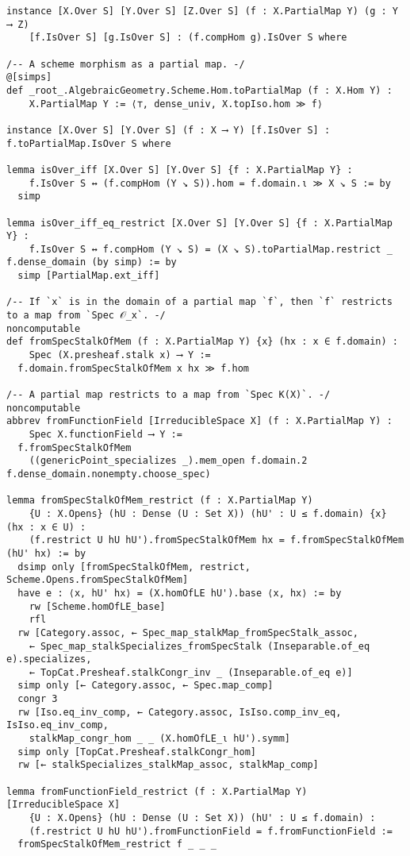 \documentclass{article}
\begin{document}
\begin{lstlisting}[language=Lean, caption={RationalMap.lean}]
instance [X.Over S] [Y.Over S] [Z.Over S] (f : X.PartialMap Y) (g : Y ⟶ Z)
    [f.IsOver S] [g.IsOver S] : (f.compHom g).IsOver S where

/-- A scheme morphism as a partial map. -/
@[simps]
def _root_.AlgebraicGeometry.Scheme.Hom.toPartialMap (f : X.Hom Y) :
    X.PartialMap Y := ⟨⊤, dense_univ, X.topIso.hom ≫ f⟩

instance [X.Over S] [Y.Over S] (f : X ⟶ Y) [f.IsOver S] : f.toPartialMap.IsOver S where

lemma isOver_iff [X.Over S] [Y.Over S] {f : X.PartialMap Y} :
    f.IsOver S ↔ (f.compHom (Y ↘ S)).hom = f.domain.ι ≫ X ↘ S := by
  simp

lemma isOver_iff_eq_restrict [X.Over S] [Y.Over S] {f : X.PartialMap Y} :
    f.IsOver S ↔ f.compHom (Y ↘ S) = (X ↘ S).toPartialMap.restrict _ f.dense_domain (by simp) := by
  simp [PartialMap.ext_iff]

/-- If `x` is in the domain of a partial map `f`, then `f` restricts to a map from `Spec 𝒪_x`. -/
noncomputable
def fromSpecStalkOfMem (f : X.PartialMap Y) {x} (hx : x ∈ f.domain) :
    Spec (X.presheaf.stalk x) ⟶ Y :=
  f.domain.fromSpecStalkOfMem x hx ≫ f.hom

/-- A partial map restricts to a map from `Spec K(X)`. -/
noncomputable
abbrev fromFunctionField [IrreducibleSpace X] (f : X.PartialMap Y) :
    Spec X.functionField ⟶ Y :=
  f.fromSpecStalkOfMem
    ((genericPoint_specializes _).mem_open f.domain.2 f.dense_domain.nonempty.choose_spec)

lemma fromSpecStalkOfMem_restrict (f : X.PartialMap Y)
    {U : X.Opens} (hU : Dense (U : Set X)) (hU' : U ≤ f.domain) {x} (hx : x ∈ U) :
    (f.restrict U hU hU').fromSpecStalkOfMem hx = f.fromSpecStalkOfMem (hU' hx) := by
  dsimp only [fromSpecStalkOfMem, restrict, Scheme.Opens.fromSpecStalkOfMem]
  have e : ⟨x, hU' hx⟩ = (X.homOfLE hU').base ⟨x, hx⟩ := by
    rw [Scheme.homOfLE_base]
    rfl
  rw [Category.assoc, ← Spec_map_stalkMap_fromSpecStalk_assoc,
    ← Spec_map_stalkSpecializes_fromSpecStalk (Inseparable.of_eq e).specializes,
    ← TopCat.Presheaf.stalkCongr_inv _ (Inseparable.of_eq e)]
  simp only [← Category.assoc, ← Spec.map_comp]
  congr 3
  rw [Iso.eq_inv_comp, ← Category.assoc, IsIso.comp_inv_eq, IsIso.eq_inv_comp,
    stalkMap_congr_hom _ _ (X.homOfLE_ι hU').symm]
  simp only [TopCat.Presheaf.stalkCongr_hom]
  rw [← stalkSpecializes_stalkMap_assoc, stalkMap_comp]

lemma fromFunctionField_restrict (f : X.PartialMap Y) [IrreducibleSpace X]
    {U : X.Opens} (hU : Dense (U : Set X)) (hU' : U ≤ f.domain) :
    (f.restrict U hU hU').fromFunctionField = f.fromFunctionField :=
  fromSpecStalkOfMem_restrict f _ _ _


\end{lstlisting}
\end{document}

